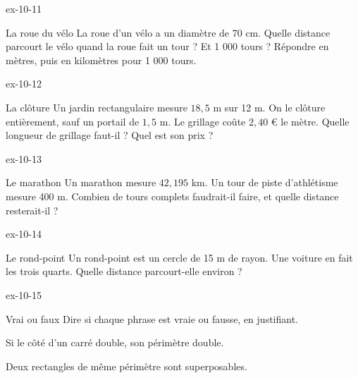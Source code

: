 \begin{blocLivre}{ex-10-11}\begin{exercice}[3]{La roue du vélo}
La roue d’un vélo a un diamètre de 70 cm. Quelle distance parcourt le vélo quand la roue fait un tour ? Et 1 000 tours ? Répondre en mètres, puis en kilomètres pour 1 000 tours.
\end{exercice}\end{blocLivre}
\begin{blocLivre}{ex-10-12}\begin{exercice}[3]{La clôture}
Un jardin rectangulaire mesure $18{,}5$ m sur 12 m. On le clôture entièrement, sauf un portail de $1{,}5$ m. Le grillage coûte $2{,}40$ € le mètre. Quelle longueur de grillage faut-il ? Quel est son prix ?
\end{exercice}\end{blocLivre}
\begin{blocLivre}{ex-10-13}\begin{exercice}[3]{Le marathon}
Un marathon mesure $42{,}195$ km. Un tour de piste d’athlétisme mesure 400 m. Combien de tours complets faudrait-il faire, et quelle distance resterait-il ?
\end{exercice}\end{blocLivre}
\begin{blocLivre}{ex-10-14}\begin{exercice}[3]{Le rond-point}
Un rond-point est un cercle de 15 m de rayon. Une voiture en fait les trois quarts. Quelle distance parcourt-elle environ ?
\label{fig-ex-10-14}
\end{exercice}\end{blocLivre}
\begin{blocLivre}{ex-10-15}\begin{exercice}[3]{Vrai ou faux}
Dire si chaque phrase est vraie ou fausse, en justifiant.\begin{questions}
\item Si le côté d’un carré double, son périmètre double.
\item Deux rectangles de même périmètre sont superposables.
\end{questions}
\end{exercice}\end{blocLivre}

\clearpage
